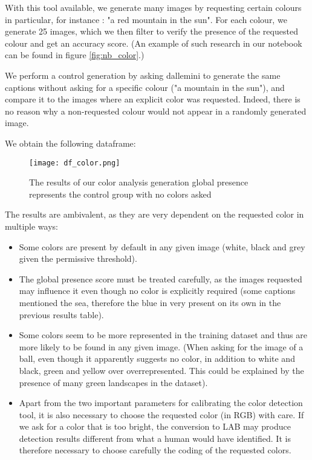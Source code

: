\documentclass{article}
\begin{document}
\begin{multicols}{2}
With this tool available, we generate many images by requesting certain colours in particular, for instance : "a red mountain in the sun". For each colour, we generate 25 images, which we then filter to verify the presence of the requested colour and get an accuracy score. (An example of such research in our notebook can be found in figure \ref{fig:nb_color}.)

We perform a control generation by asking \gls{dallemini} to generate the same captions without asking for a specific colour ("a mountain in the sun"), and compare it to the images where an explicit color was requested. Indeed, there is no reason why a non-requested colour would not appear in a randomly generated image.

We obtain the following dataframe:

\begin{figure}[H]
    \centering
    \texttt{[image: df\_color.png]}
    \caption{The results of our color analysis generation global presence represents the control group with no colors asked}
    \label{fig:df_color}
\end{figure}

The results are ambivalent, as they are very dependent on the requested color in multiple ways: 

\begin{itemize}
    \item Some colors are present by default in any given image (white, black and grey given the permissive threshold).
    \item The global presence score must be treated carefully, as the images requested may influence it even though no color is explicitly required (some captions mentioned the sea, therefore the blue in very present on its own in the previous results table).
    \item Some colors seem to be more represented in the training dataset and thus are more likely to be found in any given image. (When asking for the image of a ball, even though it apparently suggests no color, in addition to white and black, green and yellow over overrepresented. This could be explained by the presence of many green landscapes in the dataset).
    \item Apart from the two important parameters for calibrating the color detection tool, it is also necessary to choose the requested color (in RGB) with care. If we ask for a color that is too bright, the conversion to LAB may produce detection results different from what a human would have identified. It is therefore necessary to choose carefully the coding of the requested colors.
\end{itemize}  


\end{multicols}
\end{document}
